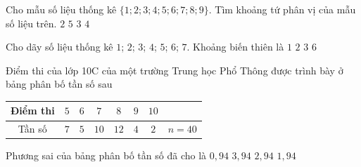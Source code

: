 \begin{ex}%
	Cho mẫu số liệu thống kê $\{ 1;2;3;4;5;6;7;8;9 \}$. Tìm khoảng tứ phân vị của mẫu số liệu trên.
	\choice
	{$2$}
	{\True $5$}
	{$3$}
	{$4$}
\end{ex}	

\begin{ex}%
	Cho dãy số liệu thống kê $1$; $2$; $3$; $4$; $5$; $6$; $7$. Khoảng biến thiên là 
	\choice
	{$1$}
	{$2$}
	{$3$}
	{\True $6$}
\end{ex}	

\begin{ex}%
	Điểm thi của lớp 10C của một trường Trung học Phổ Thông được trình bày ở bảng phân bố tần số sau
	\begin{center}
		\begin{tabular}{|c|c|c|c|c|c|c|c|}
			\hline Điểm thi	& $5$ & $6$ & $7$ & $8$ & $9$ & $10$ & \\
			\hline Tần số	& $7$ & $5$ & $10$ & $12$ & $4$ & $2$ & $n=40$\\
			\hline 
		\end{tabular}
	\end{center}
	Phương sai của bảng phân bố tần số đã cho là 
	\choice
	{$0{,}94$}
	{$3{,}94$}
	{$2{,}94$}
	{\True $1{,}94$}
\end{ex}	

